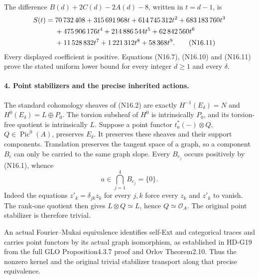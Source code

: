 The difference $B(d)+2C(d)-2A(d)-8$, written in $t=d-1$, is
\begin{align}
 S(t)={}&70\,732\,408+315\,691\,968t+614\,745\,312t^2
                 +683\,183\,760t^3\notag\\
       &+475\,906\,176t^4+214\,886\,544t^5
                 +62\,842\,560t^6\notag\\
       &+11\,528\,832t^7+1\,221\,312t^8+58\,368t^9.
                                                        \tag{N16.11}
\end{align}
Every displayed coefficient is positive. Equations (N16.7),
(N16.10) and (N16.11) prove the stated uniform lower bound for
every integer $d\geq1$ and every $\delta$.

\paragraph{4. Point stabilizers and the precise inherited actions.}
The standard cohomology sheaves of (N16.2) are exactly
$H^{-1}(E_\delta)=N$ and $H^0(E_\delta)=L\oplus P_0$.
The torsion subsheaf of $H^0$ is intrinsically $P_0$, and its
torsion-free quotient is intrinsically $L$. Suppose a point
functor $t_a^*(-)\otimes Q$, $Q\in\operatorname{Pic}^0(A)$,
preserves $E_\delta$. It preserves these sheaves and their
support components. Translation preserves the tangent space
of a graph, so a component $B_\epsilon$ can only be carried to
the same graph slope. Every $B_{e_j}$ occurs positively by
(N16.1), whence
\[
                a\in\bigcap_{j=1}^4B_{e_j}=\{0\}.
\]
Indeed the equations $z'_k=\delta_{jk}z_k$ for every $j,k$
force every $z_k$ and $z'_k$ to vanish. The rank-one quotient
then gives $L\otimes Q\simeq L$, hence $Q\simeq\mathcal O_A$.
The original point stabilizer is therefore trivial.

An actual Fourier--Mukai equivalence identifies self-Ext and
categorical traces and carries point functors by its actual
graph isomorphism, as established in HD-G19 from the full
GLO Proposition4.3.7 proof and Orlov Theorem2.10. Thus the
nonzero kernel and the original trivial stabilizer transport
along that precise equivalence.

